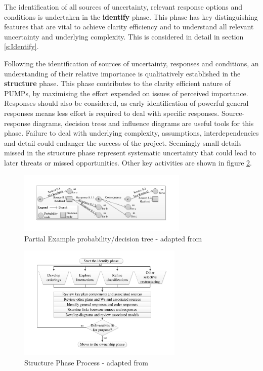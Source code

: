 The identification of all sources of uncertainty, relevant response options and conditions is undertaken in the \textbf{identify} phase.
This phase has key distinguishing features that are vital to achieve clarity efficiency and to understand all relevant uncertainty and underlying complexity.
This is considered in detail in section \ref{s:Identify}.

Following the identification of sources of uncertainty, responses and conditions, an understanding of their relative importance is qualitatively established in the \textbf{structure} phase.
This phase contributes to the clarity efficient nature of PUMPs, by maximising the effort expended on issues of perceived importance.
Responses should also be considered, as early identification of powerful general responses means less effort is required to deal with specific responses.
Source-response diagrams, decision tress and influence diagrams are useful tools for this phase.
Failure to deal with underlying complexity, assumptions, interdependencies and detail could endanger the success of the project.
Seemingly small details missed in the structure phase represent systematic uncertainty that could lead to later threats or missed opportunities.
Other key activities are shown in figure \ref{Figure:Structure}.

\begin{figure}[!h]
  \centering
    \includegraphics[height = 2.95cm]{./Figures/DecisionTreeChapman79.pdf} 
\caption{Partial Example probability/decision tree - adapted from \cite{SCERT}}
\label{Figure:Decisiontree}
\end{figure}

\begin{figure}[!h]
  \centering
    \includegraphics[width = 0.7\textwidth]{./Figures/Structure.pdf} 
\caption{Structure Phase Process - adapted from \cite{chapman}}
\label{Figure:Structure}
\end{figure}

